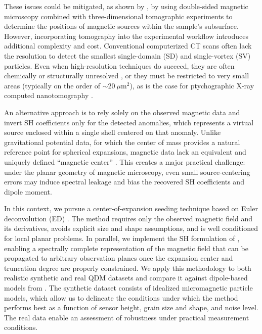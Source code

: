 These issues could be mitigated, as shown by \citet{Out2026}, by using double-sided magnetic microscopy combined with three-dimensional tomographic experiments to determine the positions of magnetic sources within the sample's subsurface. However, incorporating tomography into the experimental workflow introduces additional complexity and cost. Conventional computerized CT scans often lack the resolution to detect the smallest single-domain (SD) and single-vortex (SV) particles. Even when high-resolution techniques do succeed, they are often chemically or structurally unresolved \cite[\textit{e.g.}, Focused Ion Beam tomography, ][]{Nikolaisen-2020,Hristo-2025}, or they must be restricted to very small areas (typically on the order of $\sim 20~\mu\mathrm{m}^2$), as is the case for ptychographic X-ray computed nanotomography \citep[\textit{e.g.}, ][]{Bellon-2024a, Kuppili2024}. 

An alternative approach is to rely solely on the observed magnetic data and invert SH coefficients only for the detected anomalies, which represents a virtual source enclosed within a single shell centered on that anomaly. Unlike gravitational potential data, for which the center of mass provides a natural reference point for spherical expansions, magnetic data lack an equivalent and uniquely defined ``magnetic center'' \citep{Lima2023}. This creates a major practical challenge: under the planar geometry of magnetic microscopy, even small source-centering errors may induce spectral leakage and bias the recovered SH coefficients and dipole moment.

In this context, we pursue a center-of-expansion seeding technique based on Euler deconvolution (ED) \citep{Reid1990,Souza-Junior2024,SouzaJunior2026}. The method requires only the observed magnetic field and its derivatives, avoids explicit size and shape assumptions, and is well conditioned for local planar problems. In parallel, we implement the SH formulation of \citet{Lima2023}, enabling a spectrally complete representation of the magnetic field that can be propagated to arbitrary observation planes once the expansion center and truncation degree are properly constrained. We apply this methodology to both realistic synthetic and real QDM datasets and compare it against dipole-based models from \citet{SouzaJunior2026}. The synthetic dataset consists of idealized micromagnetic particle models, which allow us to delineate the conditions under which the method performs best as a function of sensor height, grain size and shape, and noise level. The real data enable an assessment of robustness under practical measurement conditions.

